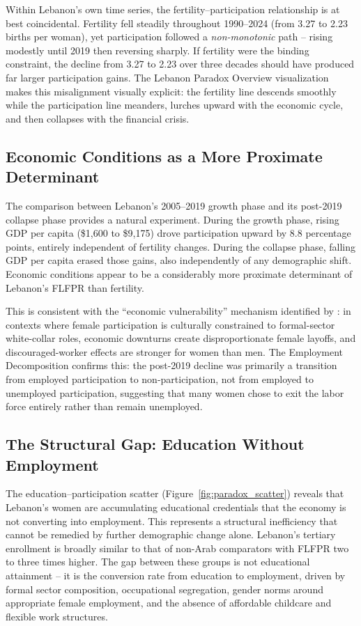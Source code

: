 \documentclass[12pt,a4paper]{article}
\begin{document}
Within Lebanon's own time series, the fertility--participation relationship is at best coincidental. Fertility fell steadily throughout 1990--2024 (from 3.27 to 2.23 births per woman), yet participation followed a \textit{non-monotonic} path -- rising modestly until 2019 then reversing sharply. If fertility were the binding constraint, the decline from 3.27 to 2.23 over three decades should have produced far larger participation gains. The Lebanon Paradox Overview visualization makes this misalignment visually explicit: the fertility line descends smoothly while the participation line meanders, lurches upward with the economic cycle, and then collapses with the financial crisis.

\subsection{Economic Conditions as a More Proximate Determinant}

The comparison between Lebanon's 2005--2019 growth phase and its post-2019 collapse phase provides a natural experiment. During the growth phase, rising GDP per capita (\$1,600 to \$9,175) drove participation upward by 8.8 percentage points, entirely independent of fertility changes. During the collapse phase, falling GDP per capita erased those gains, also independently of any demographic shift. Economic conditions appear to be a considerably more proximate determinant of Lebanon's FLFPR than fertility.

This is consistent with the ``economic vulnerability'' mechanism identified by \citet{majbouri2020}: in contexts where female participation is culturally constrained to formal-sector white-collar roles, economic downturns create disproportionate female layoffs, and discouraged-worker effects are stronger for women than men. The Employment Decomposition confirms this: the post-2019 decline was primarily a transition from employed participation to non-participation, not from employed to unemployed participation, suggesting that many women chose to exit the labor force entirely rather than remain unemployed.

\subsection{The Structural Gap: Education Without Employment}

The education--participation scatter (Figure~\ref{fig:paradox_scatter}) reveals that Lebanon's women are accumulating educational credentials that the economy is not converting into employment. This represents a structural inefficiency that cannot be remedied by further demographic change alone. Lebanon's tertiary enrollment is broadly similar to that of non-Arab comparators with FLFPR two to three times higher. The gap between these groups is not educational attainment -- it is the conversion rate from education to employment, driven by formal sector composition, occupational segregation, gender norms around appropriate female employment, and the absence of affordable childcare and flexible work structures.
\end{document}
